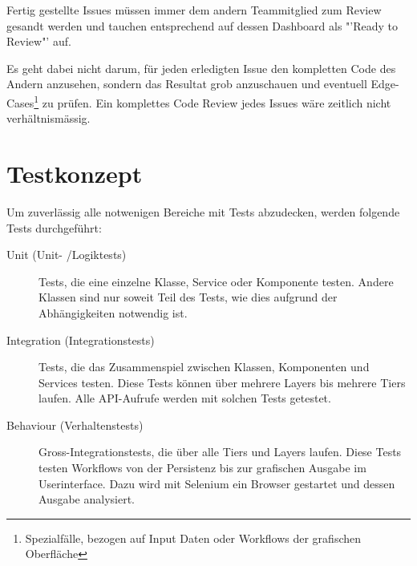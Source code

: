 		Fertig gestellte Issues müssen immer dem andern Teammitglied
		zum Review gesandt werden und tauchen entsprechend auf dessen
		Dashboard als "'Ready to Review"' auf.
		
		Es geht dabei nicht darum, 
		für jeden erledigten Issue den kompletten Code des Andern anzusehen, 
		sondern das Resultat grob anzuschauen und eventuell
		Edge-Cases\footnote{Spezialfälle, bezogen auf Input Daten oder 
		Workflows der grafischen Oberfläche} zu prüfen. 
		Ein komplettes Code Review jedes Issues wäre zeitlich nicht verhältnismässig.
		
		\section{Testkonzept}
		
			Um zuverlässig alle notwenigen Bereiche mit Tests abzudecken, 
			werden folgende Tests durchgeführt:
			
			\begin{description}
				\item[Unit (Unit- /Logiktests)] Tests, die eine einzelne Klasse, 
					Service oder Komponente testen. 
					Andere Klassen sind nur soweit Teil des Tests, 
					wie dies aufgrund der Abhängigkeiten notwendig ist.
				\item[Integration (Integrationstests)] Tests, die das Zusammenspiel zwischen Klassen, 
					Komponenten und Services testen. 
					Diese Tests können über mehrere Layers bis mehrere Tiers laufen.
					Alle API-Aufrufe werden mit solchen Tests getestet.
				\item[Behaviour (Verhaltenstests)] Gross-Integrationstests, 
					die über alle Tiers und Layers laufen. 
					Diese Tests testen Workflows von der Persistenz 
					bis zur grafischen Ausgabe im Userinterface. 
					Dazu wird mit Selenium ein Browser gestartet und dessen Ausgabe analysiert.
			\end{description}